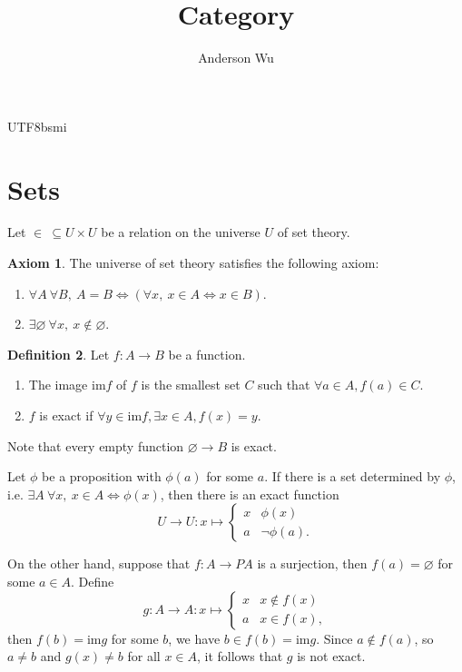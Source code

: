 \documentclass[12pt]{article}
\theoremstyle{definition}
\newtheorem{definition}{Definition}[section]
\newtheorem{axiom}[definition]{Axiom}
\newcommand\<{\langle}
\renewcommand\>{\rangle}
\begin{document}
\begin{CJK}{UTF8}{bsmi}

\title{Category}
\author{Anderson Wu}
\maketitle

\tableofcontents

\section{Sets}

Let $\in\ \subseteq U\times U$ be a relation on the universe $U$ of set theory.

\begin{axiom}
The universe of set theory satisfies the following axiom:
\begin{enumerate}
    \item $\forall A\ \forall B,\ A=B\iff(\forall x,\ x\in A\iff x\in B)$.
    \item $\exists\varnothing\ \forall x,\ x\notin \varnothing$.
\end{enumerate}
\end{axiom}

\begin{definition}
    Let $f:A\to B$ be a function.
    \begin{enumerate}
        \item The image $\text{im}f$ of $f$ is the smallest set $C$ such that $\forall a\in A, f(a)\in C$.
        \item $f$ is exact if $\forall y\in\text{im}f, \exists x\in A, f(x)=y$.
    \end{enumerate}
\end{definition}

Note that every empty function $\varnothing\to B$ is exact.

Let $\phi$ be a proposition with $\phi(a)$ for some $a$.
If there is a set determined by $\phi$, i.e. $\exists A\ \forall x,\ x\in A\iff\phi(x)$, then there is an exact function $$U\to U:x\mapsto\begin{cases}
    x & \phi(x) \\
    a & \neg \phi(a).
\end{cases}$$

On the other hand, suppose that $f:A\to PA$ is a surjection, then $f(a)=\varnothing$ for some $a\in A$.
Define $$g:A\to A:x\mapsto\begin{cases}
    x & x\notin f(x) \\
    a & x\in f(x),
\end{cases}$$ then $f(b)=\text{im}g$ for some $b$, we have $b\in f(b)=\text{im}g$.
Since $a\notin f(a)$, so $a\ne b$ and $g(x)\ne b$ for all $x\in A$, it follows that $g$ is not exact. \\


\end{CJK}
\end{document}
